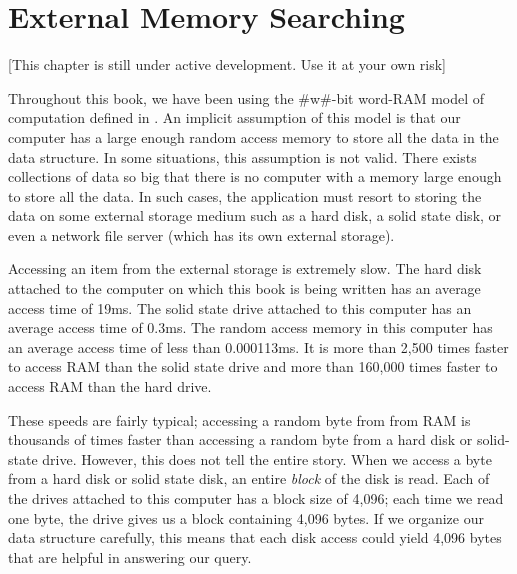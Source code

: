 \chapter{External Memory Searching}

[This chapter is still under active development.  Use it at your own risk]

Throughout this book, we have been using the #w#-bit word-RAM model
of computation defined in .   An implicit assumption of
this model is that our computer has a large enough random access memory
to store all the data in the data structure.  In some situations, this
assumption is not valid.  There exists collections of data so big that
there is no computer with a memory large enough to store all the data.
In such cases, the application must resort to storing the data on some
external storage medium such as a hard disk, a solid state disk, or even
a network file server (which has its own external storage).

Accessing an item from the external storage is extremely slow.  The hard
disk attached to the computer on which this book is being written has
an average access time of 19ms.  The solid state drive attached to this
computer has an average access time of 0.3ms.  The random access memory in
this computer has an average access time of less than 0.000113ms.  It is
more than 2,500 times faster to access RAM than the solid state drive
and more than 160,000 times faster to access RAM than the hard drive.

% 
% 
% 

These speeds are fairly typical;  accessing a random byte from from RAM
is thousands of times faster than accessing a random byte from a hard
disk or solid-state drive.  However, this does not tell the entire story.
When we access a byte from a hard disk or solid state disk, an entire
\emph{block} of the disk is read.  Each of the drives attached to
this computer has a block size of 4,096; each time we read one byte,
the drive gives us a block containing 4,096 bytes.  If we organize our
data structure carefully, this means that each disk access could yield
4,096 bytes that are helpful in answering our query.

